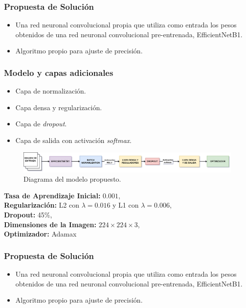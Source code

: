 \documentclass{beamer}
\begin{document}
\begin{frame}
  \frametitle{Propuesta de Solución}
  \begin{itemize}
    \item <0-> Una red neuronal convolucional propia que utiliza como entrada los pesos obtenidos de una red neuronal convolucional pre-entrenada, EfficientNetB1.
    \item <0> Algoritmo propio para ajuste de precisión.
  \end{itemize}
\end{frame}

\begin{frame}
  \frametitle{Modelo y capas adicionales}
  \begin{itemize}
    \item Capa de normalización.
    \item Capa densa y regularización.
    \item Capa de \textit{dropout}.
    \item Capa de salida con activación \textit{softmax}.
  \end{itemize}

  \begin{figure}[H]
    \begin{center}
    \includegraphics[width=1\textwidth]{./Graphics/diagrama_modelo.drawio.png}
    \caption{Diagrama del modelo propuesto.}
    \label{fig:model_permormance}
    \end{center}
  \end{figure}


 \textbf{Tasa de Aprendizaje Inicial:} $0.001$, \\ \textbf{Regularización:} L2 con $\lambda = 0.016$ y L1 con $\lambda = 0.006$, \\ \textbf{Dropout:} 45\%, \\ \textbf{Dimensiones de la Imagen:} $224 \times 224 \times 3$, \\ \textbf{Optimizador:} Adamax
\end{frame}

\begin{frame}
  \frametitle{Propuesta de Solución}
  \begin{itemize}
    \item <0> Una red neuronal convolucional propia que utiliza como entrada los pesos obtenidos de una red neuronal convolucional pre-entrenada, EfficientNetB1.
    \item <0-> Algoritmo propio para ajuste de precisión.
  \end{itemize}
\end{frame}
\end{document}
